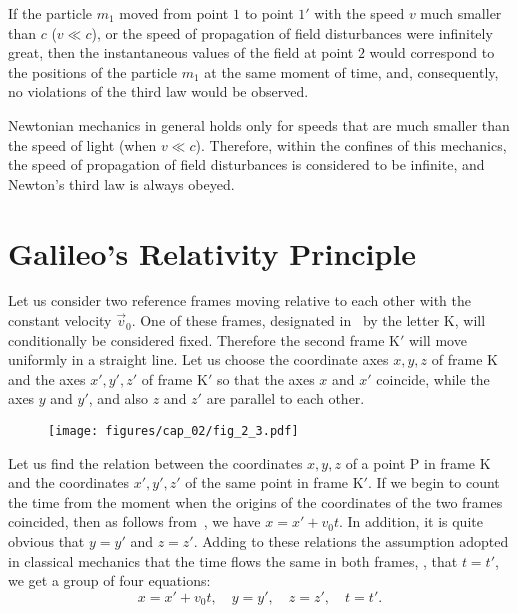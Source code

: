 If the particle $m_1$ moved from point $1$ to point $1'$ with the speed $v$ much smaller than $c$ ($v\ll c$), or the speed of propagation of field disturbances were infinitely great, then the instantaneous values of the field at point $2$ would correspond to the positions of the particle $m_1$ at the same moment of time, and, consequently, no violations of the third law would be observed.

Newtonian mechanics in general holds only for speeds that are much smaller than the speed of light (when $v\ll c$). Therefore, within the confines of this mechanics, the speed of propagation of field disturbances is considered to be infinite, and Newton's third law is always obeyed.

\section{Galileo's Relativity Principle}\label{sec:2_7}

Let us consider two reference frames moving relative to each other with the constant velocity $\vec{v}_0$. One of these frames, designated in~ by the letter K, will conditionally be considered fixed. Therefore the second frame K$'$ will move uniformly in a straight line. Let us choose the coordinate axes $x, y, z$ of frame K and the axes $x',y',z'$ of frame K$'$ so that the axes $x$ and $x'$ coincide, while the axes $y$ and $y'$, and also $z$ and $z'$ are parallel to each other.

\begin{figure}[t]
	\begin{center}
		\texttt{[image: figures/cap\_02/fig\_2\_3.pdf]}
		\caption[]{}
		\label{fig:2_3}
	\end{center}
	\vspace{-0.7cm}
\end{figure}

Let us find the relation between the coordinates $x, y, z$ of a point P in frame K and the coordinates $x', y', z'$ of the same point in frame K$'$. If we begin to count the time from the moment when the origins of the coordinates of the two frames coincided, then as follows from~, we have $x=x'+v_0t$. In addition, it is quite obvious that $y=y'$ and $z=z'$. Adding to these relations the assumption adopted in classical mechanics that the time flows the same in both frames, \ie, that $t=t'$, we get a group of four equations:
\begin{equation}\label{eq:2_19}
x=x'+v_0t,\quad y=y',\quad z=z',\quad t=t'.
\end{equation}

